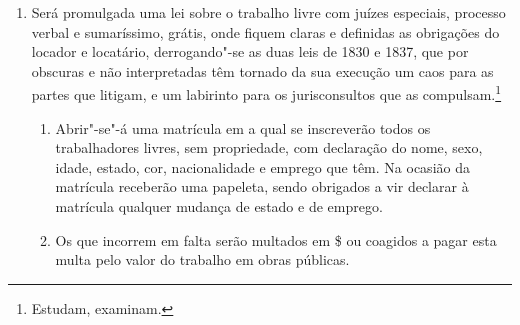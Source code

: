 \begin{enumerate}[label=Art. \arabic*º]
\begin{enumerate}[label=§ \arabic*º]
\item Para esta indenização se procederá a uma avaliação em que seja
representado o interesse particular por um louvado\footnote{Avaliador,
  perito, especialista nomeado ou escolhido pelo juiz para dar parecer
  técnico.} de sua escolha, e o da fazenda pelo seu respectivo fiscal,
ou seus delegados, com recurso aos chefes das tesourarias, ou seus
agentes.

\item Servirá {[}sic{]} de base para as ditas avaliações, a idade e o
sexo, e atendendo"-se ao valor atual, para conhecimento do que o governo
mandará formar uma tabela do termo médio pelo qual foram vendidos no ano
de 1868.

\item Para criação de fundos para esta indenização será levantado, desde
já, um imposto anual de 3\$000 por cabeça de escravo.

A soma arrecadada será recolhida para bancos territoriais, os quais se
encarregarão da referida indenização, e só poderão fazer empréstimos à
lavoura diretamente.

\item O governo por seus regulamentos garantirá e resguardará o
interesse desses bancos, estatuindo sobre o modo e condições do
empréstimo, e favorecendo as necessidades da lavoura.
\end{enumerate}

\item Será promulgada uma lei sobre o trabalho livre com juízes
especiais, processo verbal e sumaríssimo, grátis, onde fiquem claras e
definidas as obrigações do locador e locatário, derrogando"-se as duas
leis de 1830 e 1837, que por obscuras e não interpretadas têm tornado da
sua execução um caos para as partes que litigam, e um labirinto para os
jurisconsultos que as compulsam.\footnote{Estudam, examinam.}

\begin{enumerate}[label=§ \arabic*º]
\item Abrir"-se"-á uma matrícula em a qual se inscreverão todos os
trabalhadores livres, sem propriedade, com declaração do nome, sexo,
idade, estado, cor, nacionalidade e emprego que têm. Na ocasião da
matrícula receberão uma papeleta, sendo obrigados a vir declarar à
matrícula qualquer mudança de estado e de emprego.

\item Os que incorrem em falta serão multados em \$ ou coagidos a pagar
esta multa pelo valor do trabalho em obras públicas.


\end{enumerate}
\end{enumerate}
